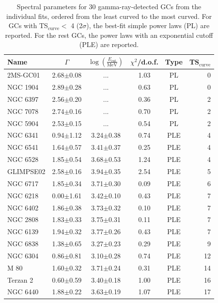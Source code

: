 \documentclass[doublespace,nopageskip]{VTthesis} %
\begin{document}
\begin{table}
\centering
\caption{Spectral parameters for 30 gamma-ray-detected GCs from the individual fits, ordered from the least curved to the most curved. For GCs with TS$_\mathrm{curve} <$ 4 (2$\sigma$), the best-fit simple power laws (PL) are reported. For the rest GCs, the power laws with an exponential cutoff (PLE) are reported. }\label{tab:spectra}
\begin{threeparttable}
\begin{tabular}{lccccr}
\toprule
Name&$\Gamma$ & $\log\left(\frac{E_\mathrm{cut}}{\mathrm{MeV}}\right)$ & $\chi^2$/d.o.f. & Type\tnote{a} & TS$_\mathrm{curve}$\\
\midrule
2MS-GC01 & {2.68$\pm$0.08} & ... & 1.03 & PL & 0 \\
NGC 1904 & {2.89$\pm$0.28} & ... & 0.63 & PL & 0 \\
NGC 6397 & {2.56$\pm$0.20} & ... & 0.36 & PL & 2 \\
NGC 7078 & {2.74$\pm$0.16} & ... & 0.70 & PL & 2 \\
NGC 5904 & {2.53$\pm$0.15} & ... & 0.54 & PL & 2 \\
\midrule
NGC 6341 & 0.94$\pm$1.12 & {3.24$\pm$0.38} & 0.74 & PLE & 4 \\
NGC 6541 & 1.64$\pm$0.57 & {3.41$\pm$0.37} & 0.25 & PLE & 4 \\
NGC 6528 & 1.85$\pm$0.54 & {3.68$\pm$0.53} & 1.24 & PLE & 4 \\
GLIMPSE02 & 2.58$\pm$0.16 & {3.94$\pm$0.35} & 2.54 & PLE & 5 \\
NGC 6717 & 1.85$\pm$0.34 & {3.71$\pm$0.30} & 0.09 & PLE & 6 \\
NGC 6218 & 0.00$\pm$1.61 & {3.42$\pm$0.10} & 0.43 & PLE & 7 \\
NGC 6402 & 1.86$\pm$0.38 & {3.73$\pm$0.32} & 0.10 & PLE & 7 \\
NGC 2808 & 1.83$\pm$0.33 & {3.75$\pm$0.31} & 0.11 & PLE & 7 \\
NGC 6139 & 1.94$\pm$0.32 & {3.77$\pm$0.26} & 0.43 & PLE & 7 \\
NGC 6838 & 1.38$\pm$0.65 & {3.27$\pm$0.23} & 0.29 & PLE & 9 \\
NGC 6304 & 0.86$\pm$0.81 & {3.10$\pm$0.28} & 0.74 & PLE & 12 \\
M 80 & 1.60$\pm$0.32 & {3.71$\pm$0.24} & 0.31 & PLE & 14 \\
Terzan 2 & 0.60$\pm$0.59 & {3.40$\pm$0.18} & 1.00 & PLE & 16 \\
NGC 6440 & 1.88$\pm$0.22 & {3.63$\pm$0.19} & 1.07 & PLE & 17 \\

\end{tabular}
\end{threeparttable}
\end{table}
\end{document}
